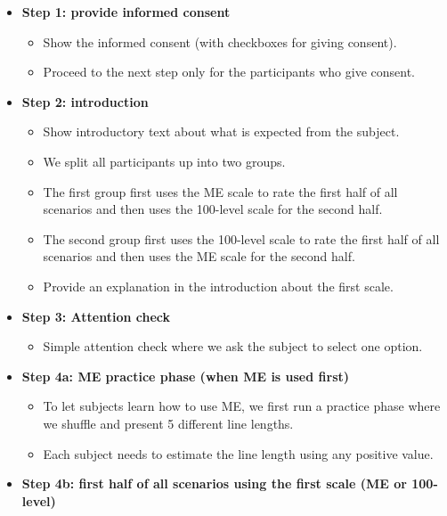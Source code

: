 \documentclass[a4paper]{article}
\begin{document}
\begin{itemize}[leftmargin=*, label={}]
    \item \textbf{Step 1: provide informed consent}
          \begin{itemize}
              \item Show the informed consent (with checkboxes for giving consent).
              \item Proceed to the next step only for the participants who give consent.
          \end{itemize}
    \item \textbf{Step 2: introduction}
          \begin{itemize}
              \item Show introductory text about what is expected from the subject.
              \item We split all participants up into two groups.
              \item The first group first uses the ME scale to rate the first half of all scenarios and then uses the 100-level scale for the second half.
              \item The second group first uses the 100-level scale to rate the first half of all scenarios and then uses the ME scale for the second half.
              \item Provide an explanation in the introduction about the first scale.
          \end{itemize}
    \item \textbf{Step 3: Attention check}
          \begin{itemize}
              \item Simple attention check where we ask the subject to select one option.
          \end{itemize}
    \item \textbf{Step 4a: ME practice phase (when ME is used first)}
          \begin{itemize}
              \item To let subjects learn how to use ME, we first run a practice phase where we shuffle and present 5 different line lengths.
              \item Each subject needs to estimate the line length using any positive value.
          \end{itemize}
    \item \textbf{Step 4b: first half of all scenarios using the first scale (ME or 100-level)}
          \begin{itemize}

\end{itemize}
\end{itemize}
\end{document}
